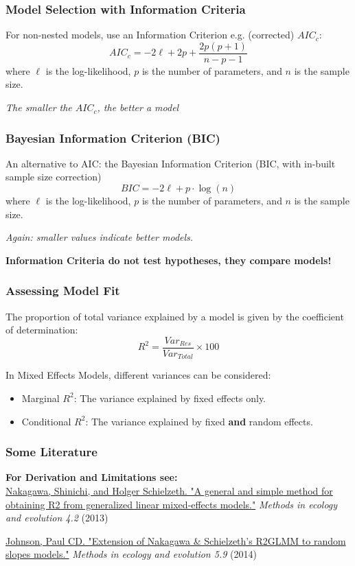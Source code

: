 \documentclass{beamer}
\begin{document}
\begin{frame}
    \frametitle{Model Selection with Information Criteria}
    \large
    For non-nested models, use an Information Criterion e.g. (corrected) $AIC_c$:
    \[
    AIC_c = -2 \ell + 2 p + \frac{2p(p+1)}{n-p-1}
    \]
    where $\ell$ is the log-likelihood, $p$ is the number of parameters, and $n$ is the sample size.
    \vspace{0.2cm}
    
    \textit{The smaller the $AIC_c$, the better a model}
\end{frame}

\begin{frame}
    \frametitle{Bayesian Information Criterion (BIC)}
    An alternative to AIC: the Bayesian Information Criterion (BIC, with in-built sample size correction)
    \[
    BIC = -2 \ell + p \cdot \log(n)
    \]
     where $\ell$ is the log-likelihood, $p$ is the number of parameters, and $n$ is the sample size.
     \vspace{0.2cm}
     
    \textit{Again: smaller values indicate better models.}
    \vspace{0.2cm}

    \textbf{Information Criteria do not test hypotheses, they compare models!}
\end{frame}

\begin{frame}
    \frametitle{Assessing Model Fit}
    The proportion of total variance explained by a model is given by the coefficient of determination:
    \[
    R^2 = \frac{Var_{Res}}{Var_{Total}} \times 100
    \]
    
    In Mixed Effects Models, different variances can be considered:
    \begin{itemize}
        \item Marginal $R^2$: The variance explained by fixed effects only.
        \item Conditional $R^2$: The variance explained by fixed \textbf{and} random effects.
    \end{itemize}
\end{frame}

\begin{frame}
    \frametitle{Some Literature}
    \large
    \textbf{For Derivation and Limitations see:}\\
    
    \href{https://besjournals.onlinelibrary.wiley.com/doi/full/10.1111/j.2041-210x.2012.00261.x}{Nakagawa, Shinichi, and Holger Schielzeth. "A general and simple method for obtaining R2 from generalized linear mixed‐effects models."} \textit{Methods in ecology and evolution 4.2} (2013)
    \vspace{0.2cm}
    
    \href{https://besjournals.onlinelibrary.wiley.com/doi/full/10.1111/2041-210X.12225}{Johnson, Paul CD. "Extension of Nakagawa \& Schielzeth's R2GLMM to random slopes models."} \textit{Methods in ecology and evolution 5.9} (2014)
\end{frame}
\end{document}
